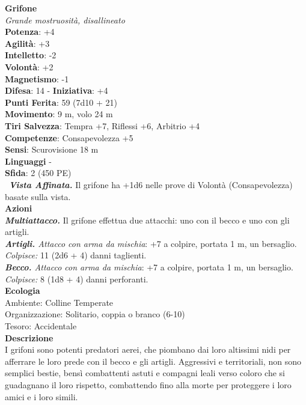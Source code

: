 \begin{multicols}{2}
\medskip\textbf{Grifone}\\
\emph{Grande mostruosità, disallineato}\\
\textbf{Potenza}: +4\\
\textbf{Agilità}: +3\\
\textbf{Intelletto}: -2\\
\textbf{Volontà}: +2\\
\textbf{Magnetismo}: -1\\
\textbf{Difesa}: 14 - \textbf{Iniziativa}: +4\\
\textbf{Punti Ferita}: 59 (7d10 + 21)\\
\textbf{Movimento}: 9 m, volo 24 m\\
\textbf{Tiri Salvezza}: Tempra +7, Riflessi +6, Arbitrio +4\\
\textbf{Competenze}: Consapevolezza +5\\
\textbf{Sensi}: Scurovisione 18 m\\
\textbf{Linguaggi} -\\
\textbf{Sfida}: 2 (450 PE)\smallskip\\\
\emph{\textbf{Vista Affinata.}} Il grifone ha +1d6 nelle prove di Volontà (Consapevolezza) basate sulla vista.\\
\smallskip\textbf{Azioni}\\
\emph{\textbf{Multiattacco.}} Il grifone effettua due attacchi: uno con il becco e uno con gli artigli.\\
\emph{\textbf{Artigli.} Attacco con arma da mischia}: +7 a colpire, portata 1 m, un bersaglio.\\
\emph{Colpisce:} 11 (2d6 + 4) danni taglienti.\\
\emph{\textbf{Becco.} Attacco con arma da mischia}: +7 a colpire, portata 1 m, un bersaglio.\\
\emph{Colpisce:} 8 (1d8 + 4) danni perforanti.\\
\textbf{Ecologia}\\
Ambiente: Colline Temperate\\
Organizzazione: Solitario, coppia o branco (6-10)\\
Tesoro: Accidentale\\
\textbf{Descrizione}\\
I grifoni sono potenti predatori aerei, che piombano dai loro altissimi nidi per afferrare le loro prede con il becco e gli artigli. Aggressivi e territoriali, non sono semplici bestie, bensì combattenti astuti e compagni leali verso coloro che si guadagnano il loro rispetto, combattendo fino alla morte per proteggere i loro amici e i loro simili.\\


\end{multicols}
